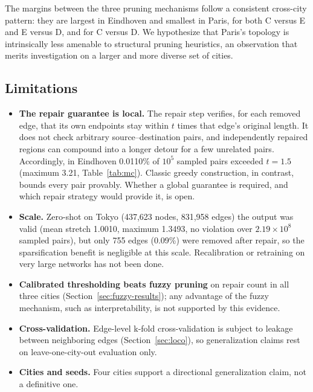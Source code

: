 \documentclass[journal]{IEEEtran}
\begin{document}
The margins between the three pruning mechanisms follow a consistent cross-city pattern: they are largest in Eindhoven and smallest in Paris, for both C versus E and E versus D, and for C versus D. We hypothesize that Paris's topology is intrinsically less amenable to structural pruning heuristics, an observation that merits investigation on a larger and more diverse set of cities.

\subsection{Limitations}
\label{sec:limits}
\begin{itemize}
    \item \textbf{The repair guarantee is local.} The repair step verifies, for each removed edge, that its own endpoints stay within $t$ times that edge's original length. It does not check arbitrary source--destination pairs, and independently repaired regions can compound into a longer detour for a few unrelated pairs. Accordingly, in Eindhoven 0.0110\% of $10^5$ sampled pairs exceeded $t = 1.5$ (maximum 3.21, Table~\ref{tab:mc}). Classic greedy construction, in contrast, bounds every pair provably. Whether a global guarantee is required, and which repair strategy would provide it, is open.
    \item \textbf{Scale.} Zero-shot on Tokyo (437,623 nodes, 831,958 edges) the output was valid (mean stretch 1.0010, maximum 1.3493, no violation over $2.19 \times 10^8$ sampled pairs), but only 755 edges (0.09\%) were removed after repair, so the sparsification benefit is negligible at this scale. Recalibration or retraining on very large networks has not been done.
    \item \textbf{Calibrated thresholding beats fuzzy pruning} on repair count in all three cities (Section~\ref{sec:fuzzy-results}); any advantage of the fuzzy mechanism, such as interpretability, is not supported by this evidence.
    \item \textbf{Cross-validation.} Edge-level k-fold cross-validation is subject to leakage between neighboring edges (Section~\ref{sec:loco}), so generalization claims rest on leave-one-city-out evaluation only.
    \item \textbf{Cities and seeds.} Four cities support a directional generalization claim, not a definitive one.
\end{itemize}
\end{document}
